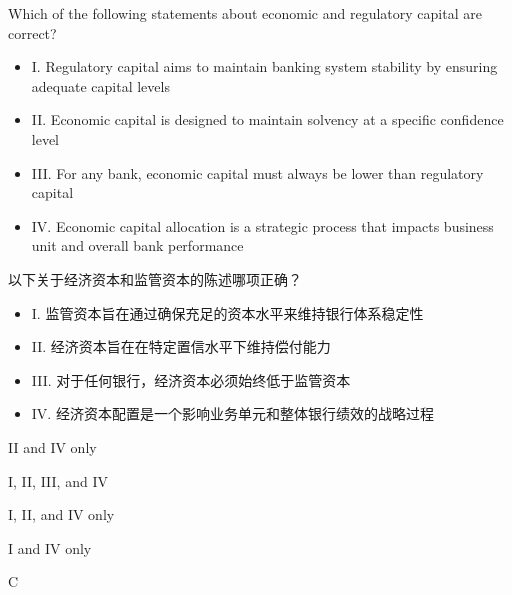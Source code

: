 \documentclass{article}
\newcounter{question} %
\begin{document}
\begin{question}
    Which of the following statements about economic and regulatory capital are correct?
    \begin{itemize}
    \item I. Regulatory capital aims to maintain banking system stability by ensuring adequate capital levels
    \item II. Economic capital is designed to maintain solvency at a specific confidence level
    \item III. For any bank, economic capital must always be lower than regulatory capital
    \item IV. Economic capital allocation is a strategic process that impacts business unit and overall bank performance
    \end{itemize}
    以下关于经济资本和监管资本的陈述哪项正确？
    \begin{itemize}
        \item I. 监管资本旨在通过确保充足的资本水平来维持银行体系稳定性
        \item II. 经济资本旨在在特定置信水平下维持偿付能力
        \item III. 对于任何银行，经济资本必须始终低于监管资本
        \item IV. 经济资本配置是一个影响业务单元和整体银行绩效的战略过程
    \end{itemize}
\end{question}

\begin{choices}
    \item II and IV only
    \item I, II, III, and IV
    \item I, II, and IV only
    \item I and IV only
\end{choices}

\begin{correctanswer}
    C
\end{correctanswer}
\end{document}
